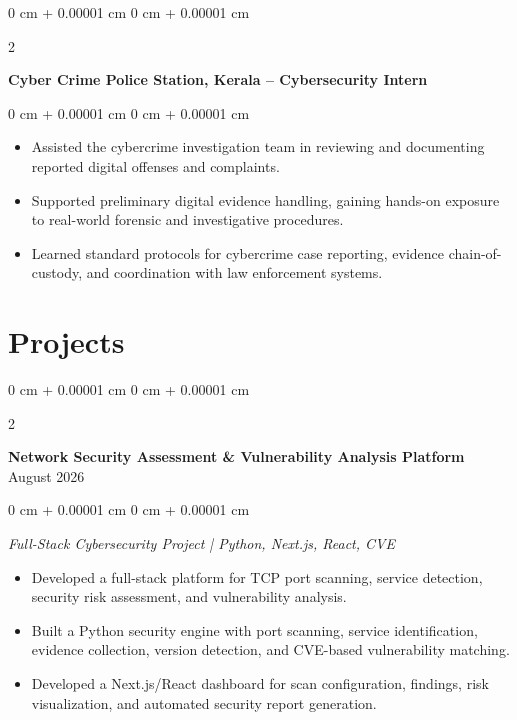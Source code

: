 \documentclass[10pt, a4paper]{article}
\newenvironment{highlights}{
    \begin{itemize}[
        topsep=0.10 cm,
        parsep=0.10 cm,
        partopsep=0pt,
        itemsep=0pt,
        leftmargin=0 cm + 10pt
    ]
}{
    \end{itemize}
} %
\newenvironment{onecolentry}{
    \begin{adjustwidth}{
        0 cm + 0.00001 cm
    }{
        0 cm + 0.00001 cm
    }
}{
    \end{adjustwidth}
} %
\newenvironment{twocolentry}[2][]{
    \onecolentry
    \def\secondColumn{#2}
    \setcolumnwidth{\fill, 4.5 cm}
    \begin{paracol}{2}
}{
    \switchcolumn \raggedleft \secondColumn
    \end{paracol}
    \endonecolentry
} %
\begin{document}
\begin{twocolentry}{
    
}
    \textbf{Cyber Crime Police Station, Kerala – Cybersecurity Intern}
\end{twocolentry}

\vspace{0.10 cm}
\begin{onecolentry}
    \begin{highlights}
        \item Assisted the cybercrime investigation team in reviewing and documenting reported digital offenses and complaints.
        \item Supported preliminary digital evidence handling, gaining hands-on exposure to real-world forensic and investigative procedures.
        \item Learned standard protocols for cybercrime case reporting, evidence chain-of-custody, and coordination with law enforcement systems.
    \end{highlights}
\end{onecolentry}

    \section{Projects}

        \vspace{0.2 cm}
        
            \begin{twocolentry}{
            August 2026
        }
            \textbf{Network Security Assessment \& Vulnerability Analysis Platform}\end{twocolentry}

        \vspace{0.01 cm}
        
        \begin{onecolentry}
            \textit{Full-Stack Cybersecurity Project | Python, Next.js, React, CVE}
        \end{onecolentry}

        \vspace{0.01 cm}
        
            \begin{highlights}
                \item Developed a full-stack platform for TCP port scanning, service detection, security risk assessment, and vulnerability analysis.
                \item Built a Python security engine with port scanning, service identification, evidence collection, version detection, and CVE-based vulnerability matching.
                \item Developed a Next.js/React dashboard for scan configuration, findings, risk visualization, and automated security report generation.
            \end{highlights}
\end{document}
